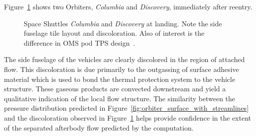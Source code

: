 Figure~\ref{fig:sts1_sts114_runway} shows two Orbiters, \emph{Columbia} and \emph{Discovery}, immediately after reentry.  
\begin{figure}[hbtp]
  \begin{center}
    \caption[Space Shuttles \emph{Columbia} and \emph{Discovery} at landing.]{Space Shuttles \emph{Columbia} and \emph{Discovery} at landing. Note the side fuselage tile layout and discoloration.  Also of interest is the difference in OMS pod TPS design~\cite{dfrc_photo_gallery}.\label{fig:sts1_sts114_runway}}    
  \end{center}
\end{figure}
The side fuselage of the vehicles are clearly discolored in the region of attached flow.  This discoloration is due primarily to the outgassing of surface adhesive material which is used to bond the thermal protection system to the vehicle structure.  These gaseous products are convected downstream and yield a qualitative indication of the local flow structure.  The similarity between the pressure distribution predicted in Figure~\ref{fig:orbiter_surface_with_streamlines} and the discoloration observed in Figure~\ref{fig:sts1_sts114_runway} helps provide confidence in the extent of the separated afterbody flow predicted by the computation.



